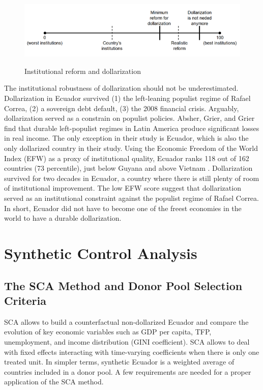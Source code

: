 \documentclass[12pt]{article}
\begin{document}
\begin{figure}[h]
    \caption{Institutional reform and dollarization}
    \centering
    \includegraphics{Figures/Fig_01.png}
    \label{fig:Fig01}
\end{figure}

The institutional robustness of dollarization should not be underestimated. Dollarization in Ecuador survived (1) the left-leaning populist regime of Rafael Correa, (2) a sovereign debt default, (3) the 2008 financial crisis. Arguably, dollarization served as a constrain on populist policies. Absher, Grier, and Grier \parencite*{Absher2020} find that durable left-populist regimes in Latin America produce significant losses in real income. The only exception in their study is Ecuador, which is also the only dollarized country in their study. Using the Economic Freedom of the World Index (EFW) as a proxy of institutional quality, Ecuador ranks 118 out of 162 countries (73 percentile), just below Guyana and above Vietnam \parencite{EFW_2019}. Dollarization survived for two decades in Ecuador, a country where there is still plenty of room of institutional improvement. The low EFW score suggest that dollarization served as an institutional constraint against the populist regime of Rafael Correa. In short, Ecuador did not have to become one of the freest economies in the world to have a durable dollarization.


\section{Synthetic Control Analysis}
    \label{sec:SCA}

\subsection{The SCA Method and Donor Pool Selection Criteria}

SCA allows to build a counterfactual non-dollarized Ecuador and compare the evolution of key economic variables such as GDP per capita, TFP, unemployment, and income distribution (GINI coefficient). SCA allows to deal with fixed effects interacting with time-varying coefficients when there is only one treated unit. In simpler terms, synthetic Ecuador is a weighted average of countries included in a donor pool. A few requirements are needed for a proper application of the SCA method.
\end{document}
